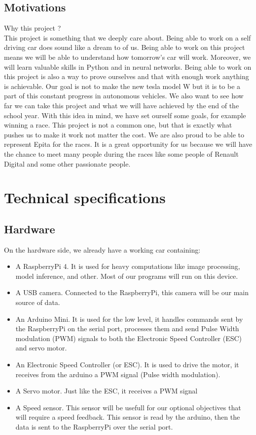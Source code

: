\documentclass[12pt]{article}
\begin{document}
\subsection{Motivations}
Why this project ? \\
This project is something that we deeply care about. Being able to work on a self driving car does sound like a dream to of us. Being able to work on this project means we will be able to understand how tomorrow's car will work. Moreover, we will learn valuable skills in Python and in neural networks. 
Being able to work on this project is also a way to prove ourselves and that with enough work anything is achievable.
Our goal is not to make the new tesla model W but it is to be a part of this constant progress in autonomous vehicles. We also want to see how far we can take this project and what we will have achieved by the end of the school year. With this idea in mind, we have set ourself some goals, for example winning a race. This project is not a common one, but that is exactly what pushes us to make it work not matter the cost. We are also proud to be able to represent Epita for the races. 
It is a great opportunity for us because we will have the chance to meet many people during the races like some people of Renault Digital and some other passionate people.


\section{Technical specifications}

\subsection{Hardware}
On the hardware side, we already have a working car containing:
\begin{itemize}
\item A RaspberryPi 4. It is used for heavy computations like image processing, model inference, and other. Most of our programs will run on this device.
\item A USB camera. Connected to the RaspberryPi, this camera will be our main source of data.
\item An Arduino Mini. It is used for the low level, it handles commands sent by the RaspberryPi on the serial port, processes them and send Pulse Width modulation (PWM) signals to both the Electronic Speed Controller (ESC) and servo motor.
\item An Electronic Speed Controller (or ESC). It is used to drive the motor, it receives  from the arduino a PWM signal (Pulse width modulation).
\item A Servo motor. Just like the ESC, it receives a PWM signal
\item A Speed sensor. This sensor will be usefull for our optional objectives that will require a speed feedback. This sensor is read by the arduino, then the data is sent to the RaspberryPi over the serial port.
\end{itemize}
\end{document}
